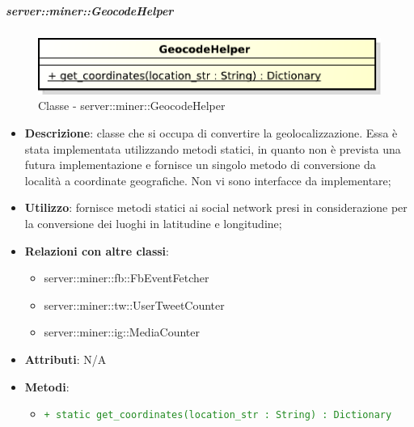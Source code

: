 		\subparagraph{server::miner::GeocodeHelper} %
		\label{subp:server_miner_GeocodeHelper}
		  	 	\begin{figure}[!htbp]
 		 			\centering
 					\centerline{\includegraphics[scale=0.75]{./images/server/classes/miner/geocode_helper.pdf}}
 					\caption{Classe - server::miner::GeocodeHelper}
				\end{figure}
				\begin{itemize}
				\item \textbf{Descrizione}: classe che si occupa di convertire la geolocalizzazione. Essa è stata implementata utilizzando metodi statici, in quanto non è prevista una futura implementazione e fornisce un singolo metodo di conversione da località a coordinate geografiche. Non vi sono interfacce da implementare;
				\item \textbf{Utilizzo}: fornisce metodi statici ai social network presi in considerazione per la conversione dei luoghi in latitudine e longitudine;
				\item \textbf{Relazioni con altre classi}:
					\begin{itemize}
						\item server::miner::fb::FbEventFetcher
						\item server::miner::tw::UserTweetCounter
						\item server::miner::ig::MediaCounter
					\end{itemize}
				\item \textbf{Attributi}: N/A
				\item \textbf{Metodi}:
					\begin{itemize}
						\item \textcolor{forestgreen}{\texttt{+ static get\_coordinates(location\_str : String) : Dictionary}}
					\end{itemize}
			\end{itemize}

